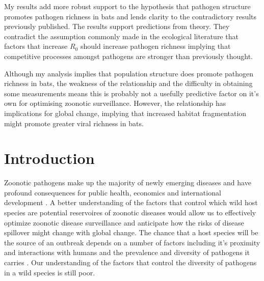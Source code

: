 My results add more robust support to the hypothesis that pathogen structure promotes pathogen richness in bats and lends clarity to the contradictory results previously published.
The results support predictions from theory.
They contradict the assumption commonly made in the ecological literature that factors that increase $R_0$ should increase pathogen richness implying that competitive processes amongst pathogens are stronger than previously thought.



Although my analysis implies that population structure does promote pathogen richness in bats, the weakness of the relationship and the difficulty in obtaining some measurements means this is probably not a usefully predictive factor on it's own for optimising zoonotic surveillance.
However, the relationship has implications for global change, implying that increased habitat fragmentation might promote greater viral richness in bats.






\section{Introduction}



Zoonotic pathogens make up the majority of newly emerging diseases and have profound consequences for public health, economics and international development \cite{jones2008global, smith2014global, ebolaWorldbank}.
A better understanding of the factors that control which wild host species are potential reservoires of zoonotic diseases would allow us to effectively optimize zoonotic disease surveillance and anticipate how the risks of disease spillover might change with global change.
The chance that a host species will be the source of an outbreak depends on a number of factors including it's proximity and interactions with humans and the prevalence and diversity of pathogens it carries \cite{wolfe2000deforestation}.
Our understanding of the factors that control the diversity of pathogens in a wild species is still poor.



